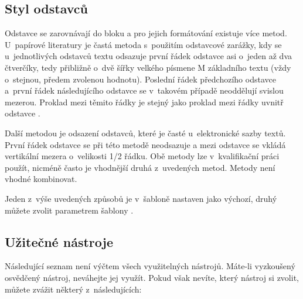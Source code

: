 \subsection*{Styl odstavců}

Odstavce se zarovnávají do bloku a pro jejich formátování existuje více metod. U~papírové literatury je častá metoda s~použitím odstavcové zarážky, kdy se u~jednotlivých odstavců textu odsazuje první řádek odstavce asi o~jeden až dva čtverčíky, tedy přibližně o~dvě šířky velkého písmene M základního textu (vždy o~stejnou, předem zvolenou hodnotu). Poslední řádek předchozího odstavce a~první řádek následujícího odstavce se v~takovém případě neoddělují svislou mezerou. Proklad mezi těmito řádky je stejný jako proklad mezi řádky uvnitř odstavce \cite{fitWeb}.

Další metodou je odsazení odstavců, které je časté u~elektronické sazby textů. První řádek odstavce se při této metodě neodsazuje a mezi odstavce se vkládá vertikální mezera o~velikosti 1/2 řádku. Obě metody lze v~kvalifikační práci použít, nicméně často je vhodnější druhá z~uvedených metod. Metody není vhodné kombinovat.

Jeden z~výše uvedených způsobů je v~šabloně nastaven jako výchozí, druhý můžete zvolit parametrem šablony .

\subsection*{Užitečné nástroje}
\label{nastroje}

Následující seznam není výčtem všech využitelných nástrojů. Máte-li vyzkoušený osvědčený nástroj, neváhejte jej využít. Pokud však nevíte, který nástroj si zvolit, můžete zvážit některý z~následujících:

